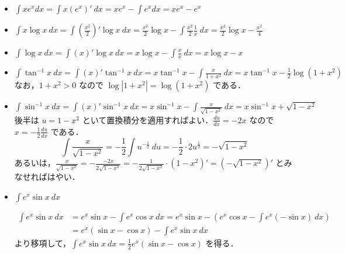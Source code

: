 \documentclass[10pt, uplatex, dvipdfmx]{jsarticle}
\theoremstyle{definition}
\numberwithin{equation}{section}
\newcommand{\ds}{\displaystyle}
\begin{document}
\begin{itemize}
  \setlength{\itemsep}{2zh}
\item $\ds \int x e^x dx = \int x \left( e^{x} \right)' \ dx = x e^x - \int e^x dx = xe^x -e^x $
  
\item $\ds \int x \log x \ dx = \int \left( \frac{x^2}{2} \right)' \log x
      \ dx = \frac{x^2}{2} \log x - \int \frac{x^2}{2} \frac{1}{x} \ dx
      = \frac{x^2}{2}\log x - \frac{x^2}{4} $

\item $\ds \int \log x \ dx
  = \int \left( x \right)' \log x \ dx = x \log x - \int \frac{x}{x} \ dx = x \log x -x $

\item $\ds \int \tan^{-1} x \ dx  =\int \left( x \right)' \tan^{-1} x \ dx =x \tan^{-1}x - \int \frac{x}{1+x^2}\  dx
  =x \tan^{-1}x -\frac{1}{2}\log (1+x^2)$\\

  なお，$1+x^2>0$ なので $\log|1+x^2| = \log(1+x^2)$ である．
  
\item $\ds \int \sin^{-1}x \ dx= \int \left( x \right)' \sin^{-1} x \ dx
    = x \sin^{-1}x - \int \frac{x}{\sqrt{1-x^2}} \ dx = x \sin^{-1} x
    + \sqrt{1-x^2}$\\

    後半は $u=1-x^2$ といて置換積分を適用すればよい．$\ds
    \frac{du}{dx} = -2x$ なので $\ds x= -\frac{1}{2}\frac{du}{dx}$ である．
    \[
      \int \frac{x}{\sqrt{1-x^2}} = -\frac{1}{2}\int u^{-\frac{1}{2}}
      \ du = -\frac{1}{2} \cdot 2 u ^{\frac{1}{2}} = -\sqrt{1-x^2}
    \]
    あるいは，$\ds \frac{x}{\sqrt{1-x^2}} = - \frac{-2x}{2\sqrt{1-x^2}} = -\frac{1}{2\sqrt{1-x^2}}\cdot (1-x^2)'
    = \left(- \sqrt{1-x^2}\right)'$ とみなせればはやい．

\item $\ds \int e^x \sin x \ dx$

  \[
    \begin{aligned}
      \int e^{x} \sin x \ dx &= e^x \sin x - \int e^x \cos x \ dx = 
      e^x \sin x - \left( e^x \cos x - \int e^x (-\sin x) \ dx \right)\\
      &= e^x \left( \sin x - \cos x \right) - \int e^{x} \sin x \ dx
    \end{aligned}
  \]
  より移項して，$\ds \int e^x \sin x \ dx = \frac{1}{2}e^x \left( \sin x - \cos x \right) $ を得る． 
\end{itemize}

\newpage
\end{document}
